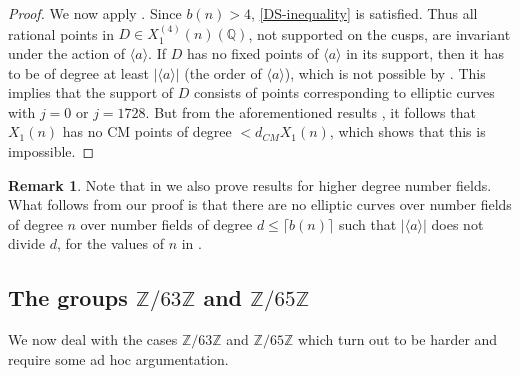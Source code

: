 \documentclass[11pt,reqno]{amsart}
\DeclareMathOperator{\rk}{rk}
\theoremstyle{definition}
\newtheorem{remark}[theorem]{Remark}
\numberwithin{equation}{section}
\newcommand{\Q}{\mathbb{Q}}
\def\torz#1{\mathbb Z /#1 \mathbb Z}
\newcommand{\diamondop}[1]{\langle #1 \rangle} %
\begin{document}
\begin{proof}
We now apply .  Since $b(n) > 4$, \eqref{DS-inequality} is satisfied. Thus all rational points in $D\in X_1^{(4)}(n)(\Q)$, not supported on the cusps, are invariant under the action of $\diamondop{a}$. If $D$ has no fixed points of $\diamondop{a}$ in its support, then it has to be of degree at least $|\diamondop{a}|$ (the order of $\diamondop{a}$), which is not possible by . This implies that the support of $D$ consists of points corresponding to elliptic curves with $j=0$ or $j=1728$. But from the aforementioned results \cite{CGPS22}, it follows that $X_1(n)$ has no CM points of degree $< d_{CM}X_1(n) $, which shows that this is impossible.



\end{proof}

\begin{remark} \label{rem:6.2}
    Note that in  we also prove results for higher degree number fields. What follows from our proof is that there are no elliptic curves over number fields of degree $n$ over number fields of degree $d\leq \lceil b(n)\rceil$  such that $|\diamondop{a}|$ does not divide $d$, for the values of $n$ in .
\end{remark}


\subsection{The groups $\torz{63}$ and $\torz{65}$} \label{sec:63_65}

We now deal with the cases $\torz{63}$ and $\torz{65}$ which turn out to be harder and require some ad hoc argumentation. %
\end{document}
